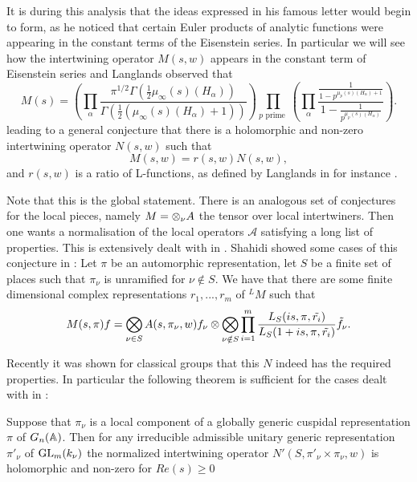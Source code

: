 It is during this analysis that the ideas expressed in his famous letter \cite{langlandsLetterweil196701_rpl_0} would begin to form, as he noticed that certain Euler products of analytic functions were appearing in the constant terms of the Eisenstein series. In particular we will see how the intertwining operator \(M(s, w)\) appears in the constant term of Eisenstein series and Langlands observed that \cite{langlandsEulerProductsa} 
\[M(s) = \left( \prod_\alpha\frac{\pi^{1/2}\Gamma(\frac{1}{2}\mu_\infty(s)(H_\alpha))}{\Gamma(\frac{1}{2}(\mu_\infty(s)(H_\alpha) + 1))} \right)\prod_{p \text{ prime }} \left( \prod_\alpha \frac{\frac{1}{1 - p^{\mu_p(s)(H_\alpha) + 1}}}{1 - \frac{1}{p^{\mu_p(s)(H_\alpha) }}}\right).\]
leading to a general conjecture that there is a holomorphic and non-zero intertwining operator \(N(s, w)\) such that 
\[M(s, w) = r(s, w)N(s,w),\]
and \(r(s, w)\) is a ratio of L-functions, as defined by Langlands in for instance \cite{langlandsEulerProductsa}.

Note that this is the global statement. There is an analogous set of conjectures for the local pieces, namely \(M = \otimes_\nu A\) the tensor over local intertwiners. Then one wants a normalisation of the local operators \(\mathscr{A}\) satisfying a long list of properties. This is extensively dealt with in \cite{shahidiProofLanglandsConjecture1990}. Shahidi showed some cases of this conjecture in \cite{shahidiRamanujanConjectureFiniteness1988}: Let \(\pi\) be an automorphic representation, let \(S\) be a finite set of places such that \(\pi_\nu\) is unramified for \(\nu\notin S\). We have that there are some finite dimensional complex representations \(r_1, ..., r_m\) of \(^LM\) such that 
\[M(s, \pi)f = \bigotimes_{\nu\in S}A(s, \pi_\nu, w)f_\nu \otimes \bigotimes_{\nu\notin S} \prod_{i=1}^{m}\frac{L_S(is, \pi, \tilde{r_i})}{L_S(1+is, \pi, \tilde{r_i})} \tilde{f}_\nu.\]

Recently it was shown for classical groups that this \(N\) indeed has the required properties. In particular the following theorem is sufficient for the cases dealt with in \cite{jiangPolesCertainResidual2013}:
\begin{Theorem}
	Suppose that \(\pi_\nu\) is a local component of a globally generic cuspidal representation \(\pi\) of \(G_n(\A)\). Then for any irreducible admissible unitary generic representation \(\pi'_\nu\) of \(\operatorname{GL}_m(k_\nu)\) the normalized intertwining operator \(N'(S, \pi'_\nu\times \pi_\nu, w)\) is holomorphic and non-zero for \(Re(s)\geq 0\)
\end{Theorem}


